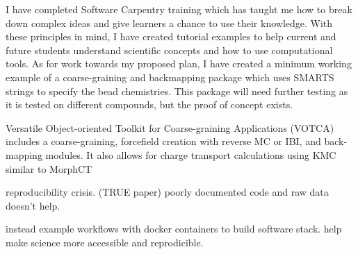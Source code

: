 I have completed Software Carpentry training which has taught me how to break down complex ideas and give learners a chance to use their knowledge.
With these principles in mind, I have created tutorial examples to help current and future students understand scientific concepts and how to use computational tools. %
As for work towards my proposed plan, I have created a minimum working example of a coarse-graining and backmapping package which uses SMARTS strings to specify the bead chemistries. %
This package will need further testing as it is tested on different compounds, but the proof of concept exists.

Versatile Object-oriented Toolkit for Coarse-graining Applications (VOTCA) \cite{Ruhle2011b}
includes a coarse-graining, forcefield creation with reverse MC or IBI, and back-mapping modules.
It also allows for charge transport calculations using KMC similar to MorphCT \cite{Lukyanov2010}

reproducibility crisis.\cite{Cummings2019} \cite{Thompson2020} (TRUE paper) poorly documented code and raw data doesn't help.

instead example workflows with docker containers to build software stack.
help make science more accessible and reprodicible.

